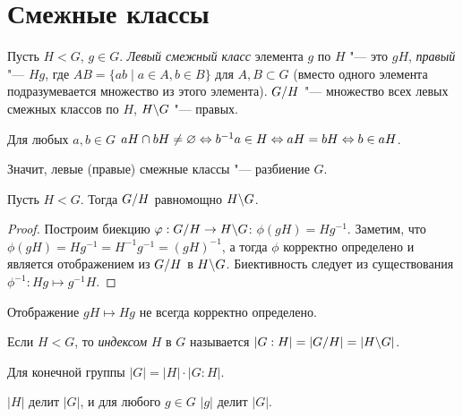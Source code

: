 \documentclass[main]{subfiles}
\begin{document}
\section{Смежные классы}
\begin{definition}
  Пусть $H < G$, $g \in G$.
  \emph{Левый смежный класс} элемента $g$ по $H$ "--- это $gH$,
  \emph{правый} "--- $Hg$,
  где $AB = \{ ab \mid a \in A, b \in B \}$
  для \( A, B \subset G \)
  (вместо одного элемента подразумевается
  множество из этого элемента).
  $\Factor{G}[H]$ "--- множество всех левых смежных классов по $H$,
  $\Factor[H]{G}$ "--- правых.
\end{definition}
\begin{remark}
  Для любых $a, b \in G$
  $aH \cap bH \ne \varnothing
  \Leftrightarrow b^{-1}a \in H
  \Leftrightarrow aH = bH
  \Leftrightarrow b \in aH$.

  Значит, левые (правые) смежные классы "--- разбиение $G$.
\end{remark}

\begin{proposition}
  Пусть $H < G$. Тогда $\Factor{G}[H]$ равномощно $\Factor[H]{G}$.
\end{proposition}
\begin{proof}
  Построим биекцию $\phi : \Factor{G}[H] \to \Factor[H]{G}$:
  $\phi(gH) = H g^{-1}$.
  Заметим, что $\phi(gH) = Hg^{-1} = H^{-1} g^{-1} = (gH)^{-1}$,
  а тогда $\phi$ корректно определено
  и является отображением из $\Factor{G}[H]$ в $\Factor[H]{G}$.
  Биективность следует из существования
  \(\phi^{-1} : Hg \mapsto g^{-1}H \).
\end{proof}
\begin{remark}
  Отображение $gH \mapsto Hg$ не всегда корректно определено.
\end{remark}

\begin{definition}
  Если $H < G$, то \emph{индексом} $H$ в $G$
  называется $|G:H| = |\Factor{G}[H]| = |\Factor[H]{G}|$.
\end{definition}

\begin{theorem}[Лагранжа]
  Для конечной группы
  $|G| = |H| \cdot |G:H|$.
\end{theorem}
\begin{corollary}
  $|H|$ делит $|G|$, и для любого \( g \in G \) $|g|$ делит $|G|$.
\end{corollary}
\end{document}
